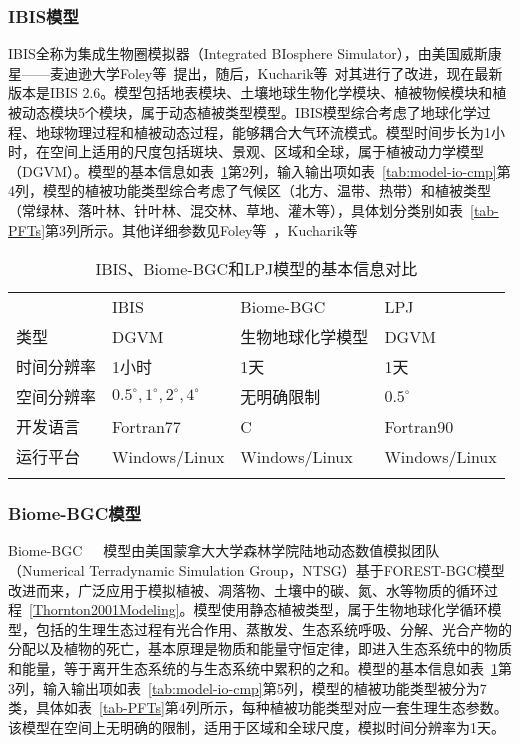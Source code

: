 \subsubsection{IBIS模型}
IBIS全称为集成生物圈模拟器（Integrated BIosphere Simulator），由美国威斯康星——麦迪逊大学Foley等~\cite{foley1996integrated}提出，随后，Kucharik等~\cite{Kucharik2000Testing}对其进行了改进，现在最新版本是IBIS 2.6。模型包括地表模块、土壤地球生物化学模块、植被物候模块和植被动态模块5个模块，属于动态植被类型模型。IBIS模型综合考虑了地球化学过程、地球物理过程和植被动态过程，能够耦合大气环流模式。模型时间步长为1小时，在空间上适用的尺度包括斑块、景观、区域和全球，属于植被动力学模型（DGVM）。模型的基本信息如表~\ref{tab:model-basic-cmp}第2列，输入输出项如表~\ref{tab:model-io-cmp}第4列，模型的植被功能类型综合考虑了气候区（北方、温带、热带）和植被类型（常绿林、落叶林、针叶林、混交林、草地、灌木等），具体划分类别如表~\ref{tab-PFTs}第3列所示。其他详细参数见Foley等~\cite{foley1996integrated}，Kucharik等~\cite{Kucharik2000Testing}

\begin{table}[H]
    \centering
    \caption{IBIS、Biome-BGC和LPJ模型的基本信息对比}
    \label{tab:model-basic-cmp}
    \begin{threeparttable}
        \begin{tabular}{llll}
            \Xhline{1.5pt}
             & IBIS & Biome-BGC & LPJ \\
            \Xhline{1pt}
            类型 & DGVM & 生物地球化学模型 & DGVM \\
            时间分辨率 & 1小时 & 1天 & 1天 \\
            空间分辨率 & $0.5^{\circ}, 1^{\circ}, 2^{\circ}, 4^{\circ}$ & 无明确限制 & $0.5^{\circ}$ \\
            开发语言 & Fortran77 & C & Fortran90 \\
            运行平台 & Windows/Linux & Windows/Linux & Windows/Linux \\
            \Xhline{1.5pt}
        \end{tabular}
    \end{threeparttable}
\end{table}

\subsubsection{Biome-BGC模型}
Biome-BGC~\cite{thornton1998regional}~\cite{kimball1997simulating}~\cite{white2000parameterization}模型由美国蒙拿大大学森林学院陆地动态数值模拟团队（Numerical Terradynamic Simulation Group，NTSG）基于FOREST-BGC模型改进而来，广泛应用于模拟植被、凋落物、土壤中的碳、氮、水等物质的循环过程~\ref{Thornton2001Modeling}。模型使用静态植被类型，属于生物地球化学循环模型，包括的生理生态过程有光合作用、蒸散发、生态系统呼吸、分解、光合产物的分配以及植物的死亡，基本原理是物质和能量守恒定律，即进入生态系统中的物质和能量，等于离开生态系统的与生态系统中累积的之和。模型的基本信息如表~\ref{tab:model-basic-cmp}第3列，输入输出项如表~\ref{tab:model-io-cmp}第5列，模型的植被功能类型被分为7类，具体如表~\ref{tab-PFTs}第4列所示，每种植被功能类型对应一套生理生态参数。该模型在空间上无明确的限制，适用于区域和全球尺度，模拟时间分辨率为1天。

